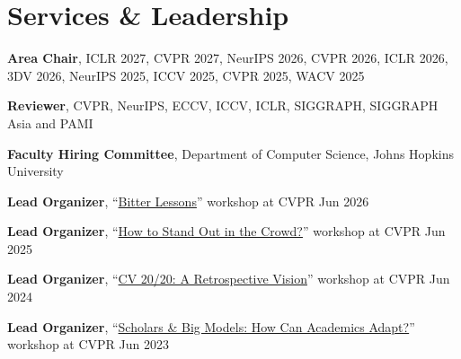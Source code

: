 \section{Services \& Leadership}
\begin{list2}
\item \parbox[t]{\dimexpr\linewidth-\cvdatew-\cvdategap\relax}{\raggedright {\bf Area Chair}, ICLR 2027, CVPR 2027, NeurIPS 2026, CVPR 2026, ICLR 2026, 3DV 2026, NeurIPS 2025, ICCV 2025, CVPR 2025, WACV 2025}\hfill{}
\item \parbox[t]{\dimexpr\linewidth-\cvdatew-\cvdategap\relax}{\raggedright {\bf Reviewer}, CVPR, NeurIPS, ECCV, ICCV, ICLR, SIGGRAPH, SIGGRAPH Asia and PAMI}\hfill{}
\end{list2}
\vspace{2ex}
\begin{list2}
\item \parbox[t]{\dimexpr\linewidth-\cvdatew-\cvdategap\relax}{\raggedright {\bf Faculty Hiring Committee}, Department of Computer Science, Johns Hopkins University}\hfill{}
\end{list2}
\vspace{2ex}
\begin{list2}
\item {\bf Lead Organizer}, ``\href{https://sites.google.com/view/bitterlessonscv/}{Bitter Lessons}'' workshop at CVPR  {\hfill\color{muted} Jun 2026}
\item {\bf Lead Organizer}, ``\href{https://sites.google.com/view/standoutcv}{How to Stand Out in the Crowd?}'' workshop at CVPR  {\hfill\color{muted} Jun 2025}
\item {\bf Lead Organizer}, ``\href{https://sites.google.com/view/retrocv/}{CV 20/20: A Retrospective Vision}'' workshop at CVPR {\hfill\color{muted} Jun 2024}
\item {\bf Lead Organizer}, ``\href{https://sites.google.com/view/academic-cv/}{Scholars \& Big Models: How Can Academics Adapt?}'' workshop at CVPR {\hfill\color{muted} Jun 2023}
\end{list2}
\vspace{2ex}
